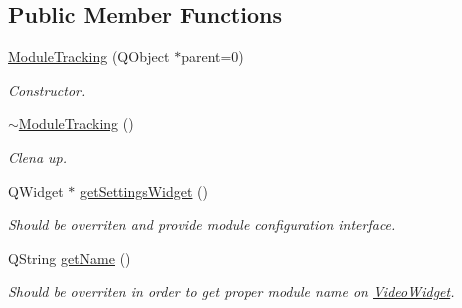 \subsection*{Public Member Functions}
\begin{DoxyCompactItemize}
\item 
\hyperlink{class_module_tracking_aea8f9cbc914b85c4b81c17e9d6cc12ec}{ModuleTracking} (QObject $\ast$parent=0)
\begin{DoxyCompactList}\small\item\em Constructor. \item\end{DoxyCompactList}\item 
\hypertarget{class_module_tracking_a8ff139d483934f0cc4eaf4103509d79a}{
\hyperlink{class_module_tracking_a8ff139d483934f0cc4eaf4103509d79a}{$\sim$ModuleTracking} ()}
\label{da/d70/class_module_tracking_a8ff139d483934f0cc4eaf4103509d79a}

\begin{DoxyCompactList}\small\item\em Clena up. \item\end{DoxyCompactList}\item 
QWidget $\ast$ \hyperlink{class_module_tracking_addbdb7fab533d049d36b807f160d3675}{getSettingsWidget} ()
\begin{DoxyCompactList}\small\item\em Should be overriten and provide module configuration interface. \item\end{DoxyCompactList}\item 
QString \hyperlink{class_module_tracking_a0e9be8f553fe9a0bc82b32d6a3fae558}{getName} ()
\begin{DoxyCompactList}\small\item\em Should be overriten in order to get proper module name on \hyperlink{class_video_widget}{VideoWidget}. \item\end{DoxyCompactList}\end{DoxyCompactItemize}
